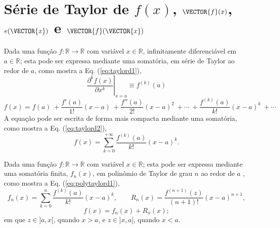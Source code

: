 
\section{Série de Taylor de $f(x)$, $\VECTOR{f}(x)$, $e(\VECTOR{x})$ e $\VECTOR{f}(\VECTOR{x})$}
\label{def:taylor}


\begin{proposition}\label{prop:taylord}
Dada uma função $f:\mathbb{R}\rightarrow \mathbb{R}$ com variável $x \in \mathbb{R}$,
infinitamente diferenciável em $a \in \mathbb{R}$;
esta pode ser expressa mediante uma somatória, em série de Taylor 
\cite[pp. 734]{stewart2008calculus} \cite[pp. 281]{telles2015matematica} \cite{Taylor} 
ao redor de $a$, como
mostra a Eq. (\ref{eq:taylord1}),%
\begin{equation}\label{eq:taylord0a}
\left.\frac{\partial^k f(x)}{\partial x^k}\right|_{x=a}\equiv f^{(k)}(a) 
\end{equation}
\begin{equation}\label{eq:taylord1}
  f(x)=f(a)
      ~+\frac{f'(a)}{1!} (x-a)
      ~+\frac{f''(a)}{2!} (x-a)^{2}
      ~+\cdots 
      ~+\frac{f^{(k)}(a)}{k!} (x-a)^{k}
      ~+\cdots 
\end{equation}
A equação pode ser escrita de forma mais compacta mediante uma somatória, como mostra a Eq. (\ref{eq:taylord2}),
\begin{equation}\label{eq:taylord2}
  f(x)=\sum\limits_{k=0}^{+\infty} \frac{f^{(k)}(a)}{k!} (x-a)^{k}.
\end{equation}
\end{proposition}

\begin{proposition}\label{prop:polytaylor}
Dada uma função $f:\mathbb{R}\rightarrow \mathbb{R}$ com variável $x \in \mathbb{R}$;
esta pode ser expressa mediante uma somatória finita, $f_n(x)$, 
em polinômio de Taylor de grau $n$ ao redor de $a$
\cite[pp. 737]{stewart2008calculus} \cite[pp. 285]{telles2015matematica}, 
 como mostra a Eq. (\ref{eq:polytaylord1}),
\begin{equation}\label{eq:polytaylord1}
  f_n(x)=\sum\limits_{k=0}^{n} \frac{f^{(k)}(a)}{k!} (x-a)^{k},
\qquad
R_n(x)=\frac{f^{(n+1)}(z)}{(n+1)!} (x-a)^{n+1},
\end{equation}
\begin{equation}\label{eq:polytaylord2}
f(x)= f_n(x) + R_n(x);
\end{equation}
em que $z \in ]a,x[$, quando $x>a$, e $z \in ]x,a[$, quando $x<a$.
\end{proposition}


